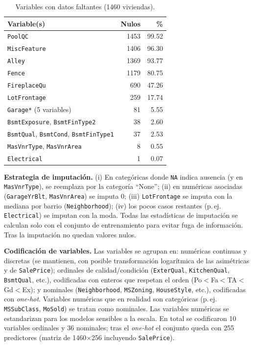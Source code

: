 \documentclass[journal]{IEEEtran}
\begin{document}
\begin{table}[!t]
\caption{Variables con datos faltantes (1460 viviendas).}
\label{tab:nulos}
\centering\small
\begin{tabular}{lrr}
\toprule
Variable(s) & Nulos & \% \\
\midrule
\texttt{PoolQC} & 1453 & 99.52 \\
\texttt{MiscFeature} & 1406 & 96.30 \\
\texttt{Alley} & 1369 & 93.77 \\
\texttt{Fence} & 1179 & 80.75 \\
\texttt{FireplaceQu} & 690 & 47.26 \\
\texttt{LotFrontage} & 259 & 17.74 \\
\texttt{Garage*} (5 variables) & 81 & 5.55 \\
\texttt{BsmtExposure}, \texttt{BsmtFinType2} & 38 & 2.60 \\
\texttt{BsmtQual}, \texttt{BsmtCond}, \texttt{BsmtFinType1} & 37 & 2.53 \\
\texttt{MasVnrType}, \texttt{MasVnrArea} & 8 & 0.55 \\
\texttt{Electrical} & 1 & 0.07 \\
\bottomrule
\end{tabular}
\end{table}

\textbf{Estrategia de imputación.} (i) En categóricas donde \texttt{NA} indica ausencia (y en \texttt{MasVnrType}), se reemplaza por la categoría ``None''; (ii) en numéricas asociadas (\texttt{GarageYrBlt}, \texttt{MasVnrArea}) se imputa 0; (iii) \texttt{LotFrontage} se imputa con la mediana por barrio (\texttt{Neighborhood}); (iv) los pocos casos restantes (p.\,ej. \texttt{Electrical}) se imputan con la moda. Todas las estadísticas de imputación se calculan solo con el conjunto de entrenamiento para evitar fuga de información. Tras la imputación no quedan valores nulos.

\textbf{Codificación de variables.} Las variables se agrupan en: numéricas continuas y discretas (se mantienen, con posible transformación logarítmica de las asimétricas y de \texttt{SalePrice}); ordinales de calidad/condición (\texttt{ExterQual}, \texttt{KitchenQual}, \texttt{BsmtQual}, etc.), codificadas con enteros que respetan el orden (Po$<$Fa$<$TA$<$Gd$<$Ex); y nominales (\texttt{Neighborhood}, \texttt{MSZoning}, \texttt{HouseStyle}, etc.), codificadas con \textit{one-hot}. Variables numéricas que en realidad son categóricas (p.\,ej. \texttt{MSSubClass}, \texttt{MoSold}) se tratan como nominales. Las variables numéricas se estandarizan para los modelos sensibles a la escala. En total se codificaron 10 variables ordinales y 36 nominales; tras el \textit{one-hot} el conjunto queda con 255 predictores (matriz de 1460$\times$256 incluyendo \texttt{SalePrice}).
\end{document}
